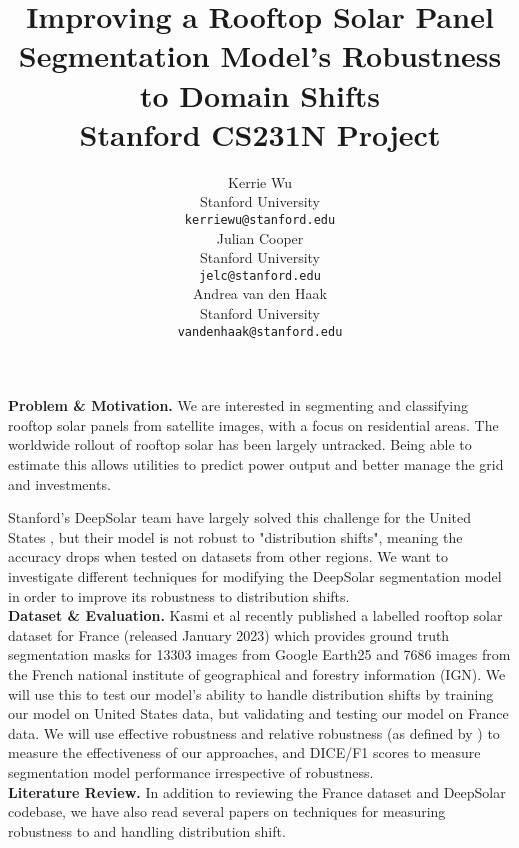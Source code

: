 \documentclass{article}
\title{
  Improving a Rooftop Solar Panel Segmentation Model's Robustness to Domain Shifts \\
  \vspace{0.15cm}
  {\normalfont Stanford CS231N Project}  
}
\author{
  Kerrie Wu \\
  Stanford University \\
  \texttt{kerriewu@stanford.edu} \\
   \And
    Julian Cooper \\
  Stanford University \\
  \texttt{jelc@stanford.edu} \\
   \And
   Andrea van den Haak \\
  Stanford University \\
  \texttt{vandenhaak@stanford.edu} \\
}
\newcommand{\note}[1]{\textcolor{blue}{{#1}}}
\begin{document}
\maketitle



\textbf{Problem \& Motivation.}
We are interested in segmenting and classifying rooftop solar panels from satellite images, with a focus on residential areas. The worldwide rollout of rooftop solar has been largely untracked. Being able to estimate this allows utilities to predict power output and better manage the grid and investments.

Stanford's DeepSolar team have largely solved this challenge for the United States \cite{DeepSolar1} \cite{DeepSolar2}, but their model is not robust to "distribution shifts", meaning the accuracy drops when tested on datasets from other regions. We want to investigate different techniques for modifying the DeepSolar segmentation model in order to improve its robustness to distribution shifts. \\

\textbf{Dataset \& Evaluation.}
Kasmi et al \cite{Kasmi2023} recently published a labelled rooftop solar dataset for France (released January 2023) which provides ground truth segmentation masks for 13303 images from Google Earth25 and 7686 images from the French national institute of geographical and forestry information (IGN). We will use this to test our model's ability to handle distribution shifts by training our model on United States data, but validating and testing our model on France data. We will use effective robustness and relative robustness (as defined by \cite{Taori2020}) to measure the effectiveness of our approaches, and DICE/F1 scores to measure segmentation model performance irrespective of robustness. \\

\textbf{Literature Review.}
In addition to reviewing the France dataset and DeepSolar codebase, we have also read several papers on techniques for measuring robustness to and handling distribution shift.
\end{document}
